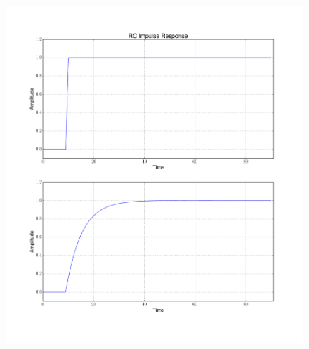 {\begin{figure}[h!tb] 
\centering
\includegraphics[width=17cm]{Experiments/Exp6/rc_response.pdf}
\label{rc_response}
\end{figure}
}




